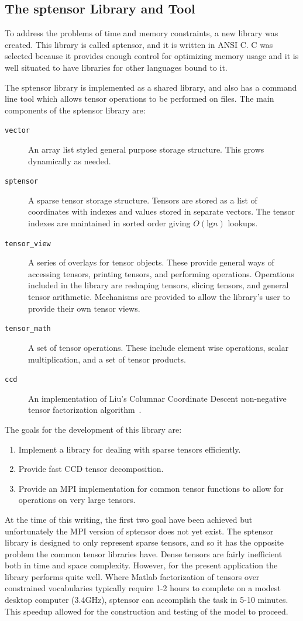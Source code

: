 \documentclass[../ut-dissertation.tex]{subfiles}
\begin{document}
\subsection{The sptensor Library and Tool}
To address the problems of time and memory constraints, a new library
was created.  This library is called sptensor, and it is written in
ANSI C.  C was selected because it provides enough control for
optimizing memory usage and it is well situated to have libraries for
other languages bound to it.

The sptensor library is implemented as a shared library, and also has a
command line tool which allows tensor operations to be performed on
files.  The main components of the sptensor library are:
\begin{description}
\item[{\tt vector}] An array list styled general purpose storage structure.
  This grows dynamically as needed.
\item[{\tt sptensor}] A sparse tensor storage structure.  Tensors are stored
  as a list of coordinates with indexes and values stored in separate
  vectors.  The tensor indexes are maintained in sorted order giving
  $O(\mathrm{lg} n)$ lookups.
\item[{\tt tensor\_view}] A series of overlays for tensor objects.  These
  provide general ways of accessing tensors, printing tensors, and
  performing operations.  Operations included in the library are
  reshaping tensors, slicing tensors, and general tensor arithmetic.
  Mechanisms are provided to allow the library's user to provide their
  own tensor views.
\item[{\tt tensor\_math}] A set of tensor operations.  These include
  element wise operations, scalar multiplication, and a set of tensor
  products.
\item[{\tt ccd}] An implementation of Liu's Columnar Coordinate
  Descent non-negative tensor factorization algorithm~\cite{liu2012sparse}.
\end{description}

The goals for the development of this library are:
\begin{enumerate}
  \item Implement a library for dealing with sparse tensors
    efficiently.
  \item Provide fast CCD tensor decomposition.
  \item Provide an MPI implementation for common tensor functions to
    allow for operations on very large tensors.
\end{enumerate}
At the time of this writing, the first two goal have been achieved but
unfortunately the MPI version of sptensor does not yet exist.  The
sptensor library is designed to only represent sparse tensors, and so
it has the opposite problem the common tensor libraries have.  Dense
tensors are fairly inefficient both in time and space complexity.
However, for the present application the library performs quite well.
Where Matlab factorization of tensors over constrained vocabularies
typically require 1-2 hours to complete on a modest desktop computer
(3.4GHz), sptensor can accomplish the task in 5-10 minutes.  This
speedup allowed for the construction and testing of the model to
proceed.
\end{document}
